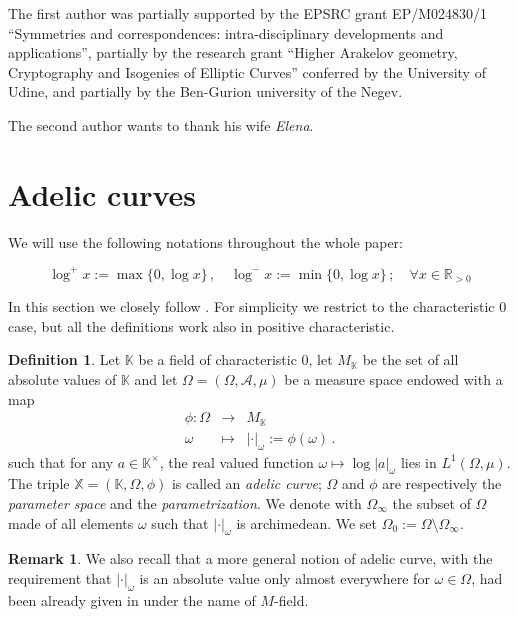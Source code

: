 \documentclass[10 pt,a4paper]{article}
\theoremstyle{plain}
\theoremstyle{definition}
\newtheorem{defn}[thm]{Definition}
\newtheorem{rem}[thm]{Remark}
\theoremstyle{named}
\begin{document}
The first author was partially supported by the EPSRC grant EP/M024830/1 ``Symmetries and correspondences: intra-disciplinary developments and applications'', partially by the research grant ``Higher Arakelov geometry, Cryptography and Isogenies of Elliptic Curves'' conferred by the University of Udine, and partially by the Ben-Gurion university of the Negev.

The second author wants to thank his wife \emph{Elena}.






\section{Adelic curves}\label{introad}
We will use the following notations throughout the whole paper:

$$\log^+ x := \max\{0, \log x\}\,,\quad \log^- x := \min\{0, \log x\}\,;\quad\forall x\in \mathbb R_{>0}$$

In this section we closely follow \cite[Chapter 3]{Ch-Mo}. For simplicity we restrict to the characteristic $0$ case, but all the definitions work also in positive characteristic.
\begin{defn}\label{AdCu}
 Let $\mathbb K$ be a field of characteristic $0$,  let $M_{\mathbb K}$ be the set of all absolute values of $\mathbb K$ and let $\Omega=(\Omega,\mathcal A, \mu)$ be a  measure space endowed with  a map 
\begin{eqnarray*}
\phi\colon \Omega&\to& M_{\mathbb K}\\
\omega &\mapsto & |\cdot|_\omega:=\phi(\omega)\,.
\end{eqnarray*} 
 such that for any $a\in \mathbb K^\times$, the real valued function $\omega\mapsto \log |a|_\omega$ lies in  $L^1(\Omega,\mu)$.  The triple $\mathbb X=(\mathbb K,\Omega,\phi)$ is called an \emph{adelic curve}; $\Omega$ and $\phi$ are respectively the \emph{parameter space} and the  \emph{parametrization}.  We denote with $\Omega_{\infty}$ the subset of $\Omega$ made  of all elements $\omega$ such that $|\cdot|_{\omega}$ is archimedean. We set  $\Omega_0:=\Omega\setminus \Omega_{\infty}$.
\end{defn}
\begin{rem}
We also recall that a more general notion of adelic curve, with the requirement that $|\cdot|_\omega$ is an absolute value only almost everywhere for $\omega\in\Omega$, had been already given in  \cite{gu}  under the name of $M$-field. 
\end{rem}
\end{document}
